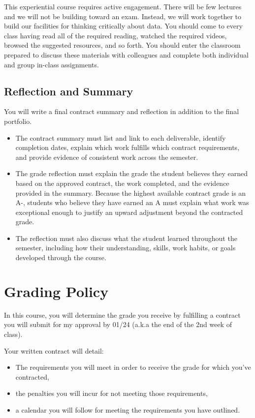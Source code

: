 \documentclass[
]{book}
\providecommand{\tightlist}{%
  \setlength{\itemsep}{0pt}\setlength{\parskip}{0pt}}
\begin{document}
This experiential course requires active engagement. There will be few lectures and we will not be building toward an exam. Instead, we will work together to build our facilities for thinking critically about data. You should come to every class having read all of the required reading, watched the required videos, browsed the suggested resources, and so forth. You should enter the classroom prepared to discuss these materials with colleagues and complete both individual and group in-class assignments.

\subsection*{Reflection and Summary}\label{reflection-and-summary}


You will write a final contract summary and reflection in addition to the final portfolio.

\begin{itemize}
\tightlist
\item
  The contract summary must list and link to each deliverable, identify completion dates, explain which work fulfills which contract requirements, and provide evidence of consistent work across the semester.
\item
  The grade reflection must explain the grade the student believes they earned based on the approved contract, the work completed, and the evidence provided in the summary. Because the highest available contract grade is an A-, students who believe they have earned an A must explain what work was exceptional enough to justify an upward adjustment beyond the contracted grade.
\item
  The reflection must also discuss what the student learned throughout the semester, including how their understanding, skills, work habits, or goals developed through the course.
\end{itemize}

\section*{Grading Policy}\label{grading-policy-2}


In this course, you will determine the grade you receive by fulfilling a contract you will submit for my approval by 01/24 (a.k.a the end of the 2nd week of class).

Your written contract will detail:

\begin{itemize}
\item
  The requirements you will meet in order to receive the grade for which you've contracted,
\item
  the penalties you will incur for not meeting those requirements,
\item
  a calendar you will follow for meeting the requirements you have outlined.
\end{itemize}
\end{document}
